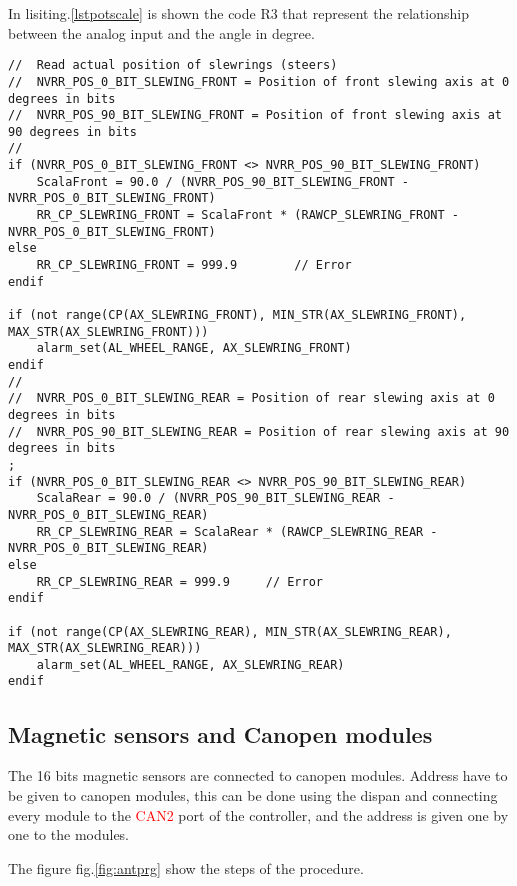 In lisiting.\ref{lstpotscale} is shown the code R3 that represent the relationship between the analog input and the angle in degree.

\begin{lstlisting}[caption= Scale potentiometer analog input, label=lstpotscale]
//	Read actual position of slewrings (steers)
// 	NVRR_POS_0_BIT_SLEWING_FRONT = Position of front slewing axis at 0 degrees in bits
// 	NVRR_POS_90_BIT_SLEWING_FRONT = Position of front slewing axis at 90 degrees in bits
//
if (NVRR_POS_0_BIT_SLEWING_FRONT <> NVRR_POS_90_BIT_SLEWING_FRONT)
	ScalaFront = 90.0 / (NVRR_POS_90_BIT_SLEWING_FRONT - NVRR_POS_0_BIT_SLEWING_FRONT)
	RR_CP_SLEWRING_FRONT = ScalaFront * (RAWCP_SLEWRING_FRONT - NVRR_POS_0_BIT_SLEWING_FRONT)
else
	RR_CP_SLEWRING_FRONT = 999.9		// Error
endif

if (not range(CP(AX_SLEWRING_FRONT), MIN_STR(AX_SLEWRING_FRONT), MAX_STR(AX_SLEWRING_FRONT)))
	alarm_set(AL_WHEEL_RANGE, AX_SLEWRING_FRONT)
endif
//
// 	NVRR_POS_0_BIT_SLEWING_REAR = Position of rear slewing axis at 0 degrees in bits
// 	NVRR_POS_90_BIT_SLEWING_REAR = Position of rear slewing axis at 90 degrees in bits
;
if (NVRR_POS_0_BIT_SLEWING_REAR <> NVRR_POS_90_BIT_SLEWING_REAR)
	ScalaRear = 90.0 / (NVRR_POS_90_BIT_SLEWING_REAR - NVRR_POS_0_BIT_SLEWING_REAR)
	RR_CP_SLEWRING_REAR = ScalaRear * (RAWCP_SLEWRING_REAR - NVRR_POS_0_BIT_SLEWING_REAR)
else
	RR_CP_SLEWRING_REAR = 999.9		// Error
endif

if (not range(CP(AX_SLEWRING_REAR), MIN_STR(AX_SLEWRING_REAR), MAX_STR(AX_SLEWRING_REAR)))
	alarm_set(AL_WHEEL_RANGE, AX_SLEWRING_REAR)
endif
\end{lstlisting}
%
\subsection{Magnetic sensors and Canopen modules}
The 16 bits magnetic sensors are connected to canopen modules. Address have to be given to canopen modules, this can be done using the dispan and connecting every module to the \textcolor{red}{CAN2} port of the controller, and the address is given one by one to the modules.

The figure fig.\ref{fig:antprg} show the steps of the procedure.

